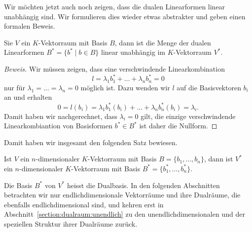 Wir möchten jetzt auch noch zeigen, dass die dualen Linearformen linear
unabhängig sind.
Wir formulieren dies wieder etwas abstrakter und geben einen formalen
Beweis.

\begin{lemma}
\label{dualraum:lemmaunabh}
Sie $V$ ein $K$-Vektorraum mit Basis $B$, dann ist die
Menge der dualen Linearformen $B^* = \{b^*\;|\;b\in B\}$ linear
unabhängig im $K$-Vektorraum $V^*$.
\end{lemma}

\begin{proof}[Beweis]
Wir müssen zeigen, dass eine verschwindende Linearkombination 
\[
l
=
\lambda_1 b_1^* + \dots +\lambda_n b_n^* = 0
\]
nur für $\lambda_1=\dots=\lambda_n=0$ möglich ist.
Dazu wenden wir $l$ auf die Basisvektoren $b_i$ an und erhalten
\[
0
=
l(b_i)
=
\lambda_1b_1^*(b_i) + \dots + \lambda_nb_n^*(b_i)
=
\lambda_i.
\]
Damit haben wir nachgerechnet, dass $\lambda_i=0$ gilt, die einzige
verschwindende Linearkombiantion von Basisformen $b^*\in B^*$ ist
daher die Nullform.
\end{proof}

Damit haben wir insgesamt den folgenden Satz bewiesen.

\begin{satz}
Ist $V$ ein $n$-dimensionaler $K$-Vektorraum mit Basis $B=\{b_1,\dots,b_n\}$,
dann ist $V^*$ ein $n$-dimensionaler $K$-Vektorraum mit 
Basis $B^*=\{b_1^*,\dots,b_n^*\}$.
\end{satz}

Die Basis $B^*$ von $V^*$ heisst die Dualbasis.
In den folgenden Abschnitten betrachten wir nur endlichdimensionale
Vektorräume und ihre Dualräume, die ebenfalls endlichdimensional sind,
und kehren erst in
Abschnitt~\ref{section:dualraum:unendlich} zu den unendlichdimensionalen
und der speziellen Struktur ihrer Dualräume zurück.

